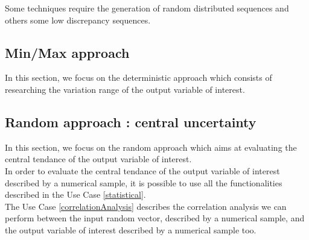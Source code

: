 Some techniques require the generation of random distributed sequences and others some low discrepancy sequences.


\newpage 



\newpage \subsection{Min/Max approach}


In this section, we focus on the deterministic approach which consists of researching the variation range of the output variable of interest.


\newpage 
\newpage 
\newpage 
\newpage 
\newpage 
\newpage 
\newpage 


\newpage \subsection{Random approach : central uncertainty}
In this section, we focus on the random approach which aims at evaluating the central tendance of the output variable of interest.\\

In order to evaluate the central tendance of the output variable of interest described by a numerical sample, it is possible to use all the functionalities described in the  Use Case \ref{statistical}.\\

The Use Case  \ref{correlationAnalysis} describes the correlation analysis we can perform between the input random  vector, described by a numerical sample, and the output variable of interest described by a numerical sample too.


\newpage 
\newpage 
\newpage 
\newpage 
\newpage 
\newpage 
\newpage 



